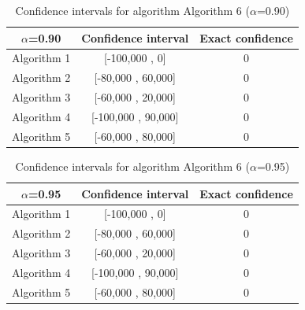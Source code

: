 \documentclass[a4paper,10pt]{article}
\begin{document}
\begin{table}[!htp]
\centering\small
\begin{tabular}{
|c|c|c|}
\hline
 $\alpha$=0.90 & Confidence interval & Exact confidence \\ \hline 
Algorithm 1 & [-100,000 , 0] & 0\\ \hline 
Algorithm 2 & [-80,000 , 60,000] & 0\\ \hline 
Algorithm 3 & [-60,000 , 20,000] & 0\\ \hline 
Algorithm 4 & [-100,000 , 90,000] & 0\\ \hline 
Algorithm 5 & [-60,000 , 80,000] & 0\\ \hline 

\end{tabular}
\caption{Confidence intervals for algorithm Algorithm 6 ($\alpha$=0.90)}
\end{table}
\begin{table}[!htp]
\centering\small
\begin{tabular}{
|c|c|c|}
\hline
 $\alpha$=0.95 & Confidence interval & Exact confidence \\ \hline 
Algorithm 1 & [-100,000 , 0] & 0\\ \hline 
Algorithm 2 & [-80,000 , 60,000] & 0\\ \hline 
Algorithm 3 & [-60,000 , 20,000] & 0\\ \hline 
Algorithm 4 & [-100,000 , 90,000] & 0\\ \hline 
Algorithm 5 & [-60,000 , 80,000] & 0\\ \hline 

\end{tabular}
\caption{Confidence intervals for algorithm Algorithm 6 ($\alpha$=0.95)}
\end{table}

 \clearpage 
\end{document}
